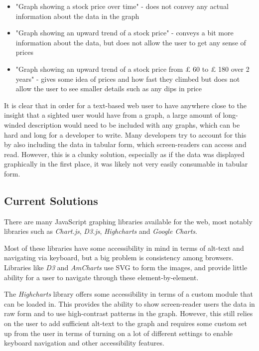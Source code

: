 \documentclass[ %
                    author={Aleena Baig},
                supervisor={Dr Simon Lock},
                    degree={BSc},
                     title={On Making Web Accessible Graphs},
                  subtitle={},
                      year={2019} ]{dissertation}
\begin{document}
\begin{itemize}
    \item "Graph showing a stock price over time" - does not convey any actual information about the data in the graph
    \item "Graph showing an upward trend of a stock price" - conveys a bit more information about the data, but does not allow the user to get any sense of prices
    \item "Graph showing an upward trend of a stock price from $\pounds$ 60 to $\pounds$ 180 over 2 years" - gives some idea of prices and how fast they climbed but does not allow the user to see smaller details such as any dips in price
\end{itemize}

It is clear that in order for a text-based web user to have anywhere close to the insight that a sighted user would have from a graph, a large amount of long-winded description would need to be included with any graphs, which can be hard and long for a developer to write. Many developers try to account for this by also including the data in tabular form, which screen-readers can access and read. However, this is a clunky solution, especially as if the data was displayed graphically in the first place, it was likely not very easily consumable in tabular form.

\subsection{Current Solutions}

There are many JavaScript graphing libraries available for the web, most notably libraries such as \textit{Chart.js}, \textit{D3.js}, \textit{Highcharts} and \textit{Google Charts}.

Most of these libraries have some accessibility in mind in terms of alt-text and navigating via keyboard, but a big problem is consistency among browsers. Libraries like \textit{D3} and \textit{AmCharts} use SVG to form the images, and provide little ability for a user to navigate through these element-by-element.

The \textit{Highcharts} library offers some accessibility in terms of a custom module that can be loaded in. This provides the ability to show screen-reader users the data in raw form and to use high-contrast patterns in the graph. However, this still relies on the user to add sufficient alt-text to the graph and requires some custom set up from the user in terms of turning on a lot of different settings to enable keyboard navigation and other accessibility features.
\end{document}
